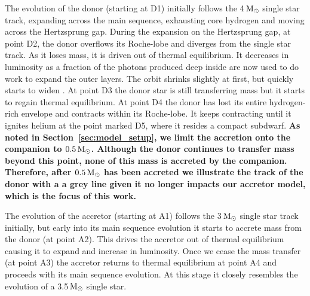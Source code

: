\documentclass[desactivate]{aa}
\newcommand{\referee}[1]{{\bf #1}}
\begin{document}
The evolution of the donor (starting at D1) initially follows the 4$\,{\rm M_\odot}$ single star track, expanding across the main sequence, exhausting core hydrogen and moving across the Hertzsprung gap. During the expansion on the Hertzsprung gap, at point D2, the donor overflows its Roche-lobe and diverges from the single star track. As it loses mass, it is driven out of thermal equilibrium. It decreases in luminosity as a fraction of the photons produced deep inside are now used to do work to expand the outer layers.  The orbit shrinks slightly at first, but quickly starts to widen \citep{Renzo+2019:2019A&A...624A..66R}. At point D3 the donor star is still transferring mass but it starts to regain thermal equilibrium. At point D4 the donor has lost its entire hydrogen-rich envelope and contracts within its Roche-lobe. It keeps contracting until it ignites helium at the point marked D5, where it resides a compact subdwarf. \referee{As noted in Section~\ref{sec:model_setup}, we limit the accretion onto the companion to $0.5 \, {\rm M_\odot}$. Although the donor continues to transfer mass beyond this point, none of this mass is accreted by the companion. Therefore, after $0.5 \, {\rm M_\odot}$ has been accreted we illustrate the track of the donor with a a grey line given it no longer impacts our accretor model, which is the focus of this work.}


The evolution of the accretor (starting at A1) follows the 3$\,{\rm M_\odot}$ single star track initially, but early into its main sequence evolution it starts to accrete mass from the donor (at point A2).  This drives the accretor out of thermal equilibrium causing it to expand and increase in luminosity. Once we cease the mass transfer (at point A3) the accretor returns to thermal equilibrium at point A4 and proceeds with its main sequence evolution. At this stage it closely resembles the evolution of a 3.5$\,{\rm M_\odot}$ single star.
\end{document}
